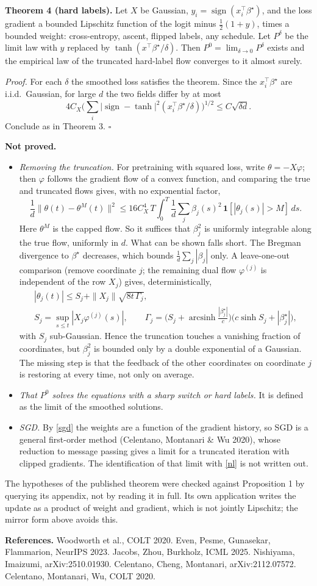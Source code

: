 \documentclass[10pt]{article}
\newcommand{\bs}{\beta^\star}\newcommand{\E}{\mathbb E}\newcommand{\asinh}{\operatorname{arcsinh}}\newcommand{\prox}{\operatorname{prox}}
\begin{document}
\textbf{Theorem 4 (hard labels).} Let $X$ be Gaussian, $y_i=\operatorname{sign}(x_i^\top\bs)$, and the loss gradient a bounded Lipschitz function of the logit minus $\frac12(1+y)$, times a bounded weight: cross-entropy, ascent, flipped labels, any schedule. Let $P^\delta$ be the limit law with $y$ replaced by $\tanh(x^\top\bs/\delta)$. Then $P^0=\lim_{\delta\to0}P^\delta$ exists and the empirical law of the truncated hard-label flow converges to it almost surely.

\emph{Proof.} For each $\delta$ the smoothed loss satisfies the theorem. Since the $x_i^\top\bs$ are i.i.d.\ Gaussian, for large $d$ the two fields differ by at most
\[4C_X\Big(\sum_i\big|\operatorname{sign}-\tanh\big|^2(x_i^\top\bs/\delta)\Big)^{1/2}\le C\sqrt{\delta d}.\] Conclude as in Theorem 3. $\square$

\textbf{Not proved.}
\begin{itemize}[nosep,leftmargin=1.2em]
\item \emph{Removing the truncation.} For pretraining with squared loss, write $\theta=-X\varphi$; then $\varphi$ follows the gradient flow of a convex function, and comparing the true and truncated flows gives, with no exponential factor,
\[
\frac1d\|\theta(t)-\theta^M(t)\|^2\le16C_X^4\,T\int_0^T\frac1d\sum_j\beta_j(s)^2\,\mathbf 1[|\theta_j(s)|>M]\,ds .
\]
Here $\theta^M$ is the capped flow. So it suffices that $\beta_j^2$ is uniformly integrable along the true flow, uniformly in $d$. What can be shown falls short. The Bregman divergence to $\bs$ decreases, which bounds $\frac1d\sum_j|\beta_j|$ only. A leave-one-out comparison (remove coordinate $j$; the remaining dual flow $\varphi^{(j)}$ is independent of the row $X_j$) gives, deterministically,
\begin{gather*}
|\theta_j(t)|\le S_j+\|X_j\|\sqrt{8t\,\Gamma_j},\\ S_j=\sup_{s\le t}|X_j\varphi^{(j)}(s)|,\qquad\Gamma_j=\big(S_j+\asinh\tfrac{|\bs_j|}c\big)\big(c\sinh S_j+|\bs_j|\big),
\end{gather*}
with $S_j$ sub-Gaussian. Hence the truncation touches a vanishing fraction of coordinates, but $\beta_j^2$ is bounded only by a double exponential of a Gaussian. The missing step is that the feedback of the other coordinates on coordinate $j$ is restoring at every time, not only on average.
\item \emph{That $P^0$ solves the equations with a sharp switch or hard labels.} It is defined as the limit of the smoothed solutions.
\item \emph{SGD.} By \eqref{sgd} the weights are a function of the gradient history, so SGD is a general first-order method (Celentano, Montanari \& Wu 2020), whose reduction to message passing gives a limit for a truncated iteration with clipped gradients. The identification of that limit with \eqref{nl} is not written out.
\end{itemize}
The hypotheses of the published theorem were checked against Proposition 1 by querying its appendix, not by reading it in full. Its own application writes the update as a product of weight and gradient, which is not jointly Lipschitz; the mirror form above avoids this.


\small\textbf{References.} Woodworth et al., COLT 2020. Even, Pesme, Gunasekar, Flammarion, NeurIPS 2023. Jacobs, Zhou, Burkholz, ICML 2025. Nishiyama, Imaizumi, arXiv:2510.01930. Celentano, Cheng, Montanari, arXiv:2112.07572. Celentano, Montanari, Wu, COLT 2020.
\end{document}
